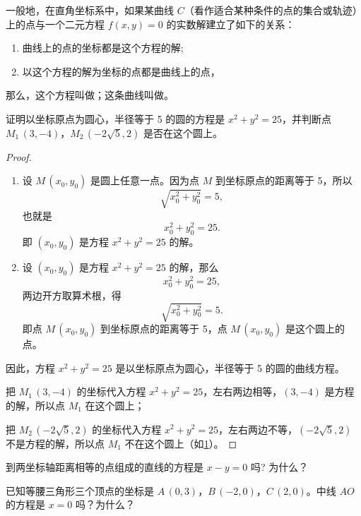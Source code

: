 一般地，在直角坐标系中，如果某曲线 $C$（看作适合某种条件的点的集合或轨迹）上的点与一个二元方程 $f(x,y)= 0$ 的实数解建立了如下的关系：
\begin{enumerate}[1.]
  \item 曲线上的点的坐标都是这个方程的解;
  \item 以这个方程的解为坐标的点都是曲线上的点，
\end{enumerate}
那么，这个方程叫做；这条曲线叫做。
\begin{example}
  证明以坐标原点为圆心，半径等于 5 的圆的方程是 $x^2+y^2=25$，并判断点 $M_1\,(3,-4)$，$M_2\,(-2\sqrt{5},2)$ 是否在这个圆上。
\end{example}
\begin{proof}
  \begin{enumerate}
    \item 设 $M\,(x_0,y_0)$ 是圆上任意一点。因为点 $M$ 到坐标原点的距离等于 5，所以
    \[ \sqrt{x_0^2+y_0^2}=5,\]
    也就是
    \[ x_0^2+y_0^2=25.\]
    即 $(x_0,y_0)$ 是方程 $x^2+y^2=25$ 的解。
    \item 设 $(x_0,y_0)$ 是方程 $x^2+y^2=25$ 的解，那么
    \[ x_0^2+y_0^2=25,\]
    两边开方取算术根，得
    \[ \sqrt{x_0^2+y_0^2}=5.\]
    即点 $M\,(x_0,y_0)$ 到坐标原点的距离等于 5，点 $M\,(x_0,y_0)$ 是这个圆上的点。
  \end{enumerate}
  
  因此，方程 $x^2+y^2=25$ 是以坐标原点为圆心，半径等于 5 的圆的曲线方程。

  把 $M_1\,(3,-4)$ 的坐标代入方程 $x^2+y^2=25$，左右两边相等，$(3,-4)$ 是方程的解，所以点 $M_1$ 在这个圆上；

  把 $M_2\,(-2\sqrt{5},2)$ 的坐标代入方程 $x^2+y^2=25$，左右两边不等，$(-2\sqrt{5},2)$ 不是方程的解，所以点 $M_1$ 不在这个圆上（如\cref{fig:2-1}）。
\end{proof}
\begin{figure}
  \caption{}\label{fig:2-1}
\end{figure}

\begin{Practice}
  \begin{question}
    \item 到两坐标轴距离相等的点组成的直线的方程是 $x-y=0$ 吗? 为什么？
    \item 已知等腰三角形三个顶点的坐标是 $A\,(0,3)$，$B\,(-2,0)$，$C\,(2,0)$。中线 $AO$ 的方程是 $x=0$ 吗？为什么？
  \end{question}
\end{Practice}


